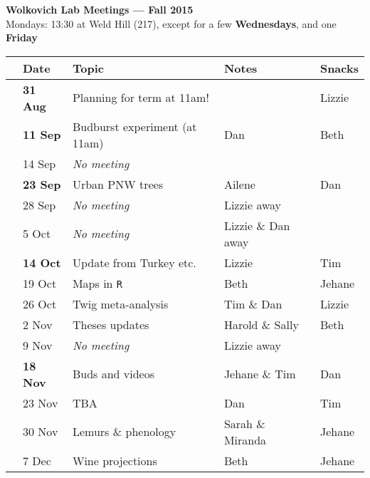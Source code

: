 \documentclass[11pt]{article}
\begin{document}
 
\raggedright
{}

\begin{center} 
{\large \textbf{Wolkovich Lab Meetings --- Fall 2015}} \\ [2pt]
Mondays: 13:30 at Weld Hill (217), except for a few {\bf Wednesdays},
and one {\bf Friday}\\
\end{center} 

\begin{center}
\begin{tabular}{ p{0.2 cm}  p{2 cm}  p{5 cm}  p{5 cm}  p{1.5 cm} }  \hline \hline
 & \textbf{Date}
   & \textbf{Topic}
      & \textbf{Notes} 
         & \textbf{Snacks} \\ 
\hline \hline
 & {\bf 31 Aug}  & Planning for term at 11am!  &        & Lizzie \\\hline
 & {\bf 11 Sep}  & Budburst experiment (at 11am) & Dan & Beth  \\\hline
 & 14 Sep & \emph{No meeting} &       &  \\\hline
 & {\bf 23 Sep}  & Urban PNW trees  & Ailene &   Dan  \\\hline
 & 28 Sep & \emph{No meeting} & Lizzie away      &  \\\hline
 & 5 Oct & \emph{No meeting} &   Lizzie \& Dan away     &  \\\hline
 & {\bf 14 Oct} & Update from Turkey etc. & Lizzie & Tim \\\hline
 & 19 Oct & Maps in \verb|R|  & Beth  & Jehane  \\\hline
 & 26 Oct & Twig meta-analysis  & Tim \& Dan & Lizzie \\\hline
 & 2 Nov & Theses updates &  Harold \& Sally     & Beth \\\hline
 & 9 Nov & \emph{No meeting} &  Lizzie away     &  \\\hline
 & {\bf 18 Nov} & Buds and videos  & Jehane \& Tim & Dan  \\\hline
 & 23 Nov & TBA  & Dan  & Tim \\\hline
 & 30 Nov & Lemurs \& phenology & Sarah \& Miranda & Jehane  \\\hline
 & 7 Dec & Wine projections   & Beth & Jehane \\\hline
\hline
\end{tabular}
\end{center}
\vspace{6pt}
\end{document}

